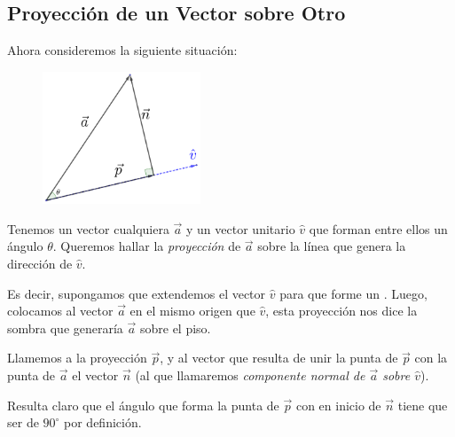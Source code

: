 \documentclass[12pt, fleqn]{report}                             %
\newcommand \Quote {\qq}                                        %
\theoremstyle{break}                                            %
\begin{document}
            \clearpage
            \subsection{Proyección de un Vector sobre Otro}
            
                Ahora consideremos la siguiente situación:

                \begin{figure}
                    \centering
                    \includegraphics[width=0.42\textwidth]{vectorProyection}
                \end{figure}

                Tenemos un vector cualquiera $\vec{a}$ y un vector unitario $\hat{v}$ que forman
                entre ellos un ángulo $\theta$.
                Queremos hallar la \emph{proyección} de $\vec{a}$ sobre la línea que genera la
                dirección de $\hat{v}$.
                
                Es decir, supongamos que extendemos el vector $\hat{v}$ para que forme un \Quote{piso}.
                Luego, colocamos al vector $\vec{a}$ en el mismo origen que $\hat{v}$, esta proyección
                nos dice la sombra que generaría $\vec{a}$ sobre el piso.
                
                Llamemos a la proyección $\vec{p}$, y al vector que resulta de unir la punta de $\vec{p}$
                con la punta de $\vec{a}$ el vector $\vec{n}$ (al que llamaremos \emph{componente normal
                de $\vec{a}$ sobre $\hat{v}$}).
                
                Resulta claro que el ángulo que forma la punta de $\vec{p}$ con en inicio de $\vec{n}$
                tiene que ser de $90^\circ$ por definición.
\end{document}
